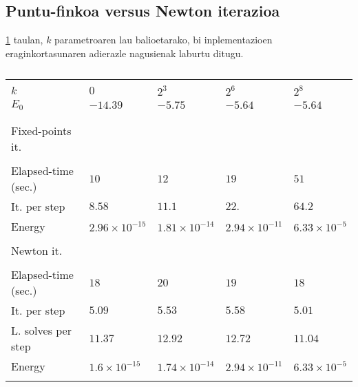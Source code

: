 \subsection{Puntu-finkoa versus Newton iterazioa}


\ref{tab:fp1} taulan, $k$ parametroaren lau balioetarako, bi inplementazioen eraginkortasunaren adierazle nagusienak laburtu ditugu.

\begin{table}[h!]
\caption[Fixed-point percentage of steps and mean iterations.] 
{}
\label{tab:fp1}       %
\centering
{%
\begin{tabular}{ l l l l l } 
 \hline
\\
 $k$               & $0$  & $2^3$ & $2^6$ & $2^8$ \\
 $E_0$           & $-14.39$  & $-5.75$ & $-5.64$ & $-5.64$ \\ 
\\
 \hline
\\
 Fixed-points it.&           &         &         &         \\
 \cline{1-1}     &           &         &         &         \\
 Elapsed-time (sec.)    & $10$      & $12$    & $19$    & $51$    \\ 
 It. per step    & $8.58$    & $11.1$  & $22.$  & $64.2$  \\
 Energy          & $2.96\times 10^{-15}$ & $1.81\times 10^{-14}$ & $2.94\times 10^{-11}$ & $6.33\times 10^{-5}$ \\
 \\
 Newton it.            &           &         &         &         \\
 \cline{1-1}           &           &         &         &         \\
 Elapsed-time (sec.)   & $18$      & $20$    & $19$    & $18$     \\
 It. per step          & $5.09$    & $5.53$  & $5.58$  & $5.01$   \\
 L. solves per step    & $11.37$   & $12.92$  & $12.72$  & $11.04$ \\
 Energy                & $1.6\times 10^{-15}$ & $1.74\times 10^{-14}$ & $2.94\times 10^{-11}$ & $6.33\times 10^{-5}$ \\   
 \\  
   \hline
 \end{tabular}}
\end{table}

